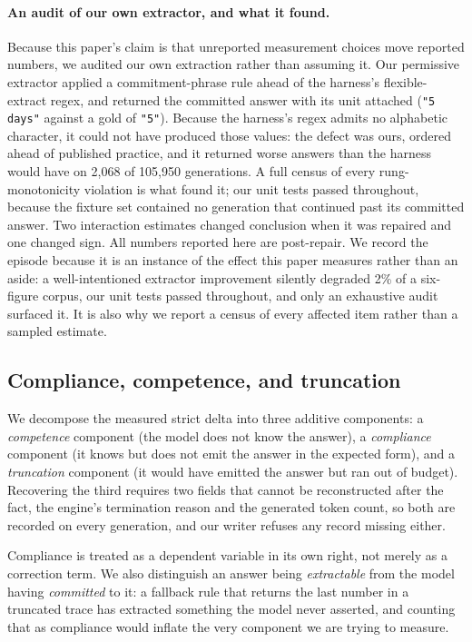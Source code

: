 \documentclass[conference]{IEEEtran}
\begin{document}
\paragraph{An audit of our own extractor, and what it found.}
Because this paper's claim is that unreported measurement choices move reported
numbers, we audited our own extraction rather than assuming it. Our permissive extractor applied a commitment-phrase rule
ahead of the harness's flexible-extract regex, and returned the committed answer
with its unit attached (\texttt{"5 days"} against a gold of \texttt{"5"}). Because
the harness's regex admits no alphabetic character, it could not have produced
those values: the defect was ours, ordered ahead of published practice, and it
returned worse answers than the harness would have on 2{,}068 of 105{,}950
generations. A full census of every rung-monotonicity violation is what found it;
our unit tests passed throughout, because the fixture set contained no generation
that continued past its committed answer. Two interaction estimates changed
conclusion when it was repaired and one changed sign. All numbers reported here are post-repair. We record the episode because it is an
instance of the effect this paper measures rather than an aside: a well-intentioned
extractor improvement silently degraded 2\% of a six-figure corpus, our unit tests
passed throughout, and only an exhaustive audit surfaced it. It is also why we report
a census of every affected item rather than a sampled estimate.

\subsection{Compliance, competence, and truncation}
\label{sec:decomp}
We decompose the measured strict delta into three additive components: a
\emph{competence} component (the model does not know the answer), a
\emph{compliance} component (it knows but does not emit the answer in the
expected form), and a \emph{truncation} component (it would have emitted the
answer but ran out of budget). Recovering the third requires two fields that
cannot be reconstructed after the fact, the engine's termination reason and
the generated token count, so both are recorded on every generation, and our
writer refuses any record missing either.

Compliance is treated as a dependent variable in its own right, not merely as a
correction term. We also distinguish an answer being \emph{extractable} from the
model having \emph{committed} to it: a fallback rule that returns the last number
in a truncated trace has extracted something the model never asserted, and
counting that as compliance would inflate the very component we are trying to
measure.
\end{document}
